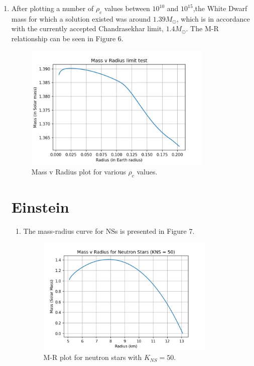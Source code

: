 \documentclass[a4paper]{article}
\begin{document}
\begin{enumerate}[label=(\alph*)]
\item After plotting a number of $\rho_{c}$ values between $10^{10}$ and $10^{15}$,the White Dwarf mass for which a solution existed was around $1.39M_{\odot}$, which is in accordance with the currently accepted Chandrasekhar limit, $1.4M_{\odot}$. The M-R relationship can be seen in Figure 6.
    
    \begin{figure}[H] 
    \centering
    \includegraphics[width=0.85\textwidth]{WD_limit.jpg}
    \caption{Mass v Radius plot for various $\rho_{c}$ values.}
    \end{figure}      



\section{Einstein}

    \begin{enumerate}[label=(\alph*)]
        \item The mass-radius curve for NSs is presented in Figure 7.
        \begin{figure}[H] 
        \centering
        \includegraphics[width=0.85\textwidth]{NS_DatvPrd_50.jpg}
        \caption{M-R plot for neutron stars with $K_{NS} = 50$.}
        \end{figure} 
        

\end{enumerate}
\end{enumerate}
\end{document}
